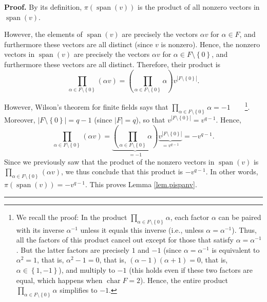 \documentclass[numbers=enddot,12pt,final,onecolumn,notitlepage]{scrartcl}%
\numberwithin{exer}{section}
\theoremstyle{definition}
\newenvironment{proof}[1][Proof]{\noindent\textbf{#1.} }{\ \rule{0.5em}{0.5em}}
\let\prodnonlimits\prod
\renewcommand{\prod}{\prodnonlimits\limits}
\theoremstyle{plainsl}
\begin{document}
\begin{proof}
By its definition, $\pi\left(  \operatorname*{span}\left(  v\right)  \right)
$ is the product of all nonzero vectors in $\operatorname*{span}\left(
v\right)  $.

However, the elements of $\operatorname*{span}\left(  v\right)  $ are
precisely the vectors $\alpha v$ for $\alpha\in F$, and furthermore these
vectors are all distinct (since $v$ is nonzero). Hence, the nonzero vectors in
$\operatorname*{span}\left(  v\right)  $ are precisely the vectors $\alpha v$
for $\alpha\in F\setminus\left\{  0\right\}  $, and furthermore these vectors
are all distinct. Therefore, their product is%
\[
\prod_{\alpha\in F\setminus\left\{  0\right\}  }\left(  \alpha v\right)
=\left(  \prod_{\alpha\in F\setminus\left\{  0\right\}  }\alpha\right)
v^{\left\vert F\setminus\left\{  0\right\}  \right\vert }.
\]


However, Wilson's theorem for finite fields says that $\prod_{\alpha\in
F\setminus\left\{  0\right\}  }\alpha=-1$\ \ \ \ \footnote{We recall the
proof: In the product $\prod_{\alpha\in F\setminus\left\{  0\right\}  }\alpha
$, each factor $\alpha$ can be paired with its inverse $\alpha^{-1}$ unless it
equals this inverse (i.e., unless $\alpha=\alpha^{-1}$). Thus, all the factors
of this product cancel out except for those that satisfy $\alpha=\alpha^{-1}$.
But the latter factors are precisely $1$ and $-1$ (since $\alpha=\alpha^{-1}$
is equivalent to $\alpha^{2}=1$, that is, $\alpha^{2}-1=0$, that is, $\left(
\alpha-1\right)  \left(  \alpha+1\right)  =0$, that is, $\alpha\in\left\{
1,-1\right\}  $), and multiply to $-1$ (this holds even if these two factors
are equal, which happens when $\operatorname*{char}F=2$). Hence, the entire
product $\prod_{\alpha\in F\setminus\left\{  0\right\}  }\alpha$ simplifies to
$-1$.}. Moreover, $\left\vert F\setminus\left\{  0\right\}  \right\vert =q-1$
(since $\left\vert F\right\vert =q$), so that $v^{\left\vert F\setminus
\left\{  0\right\}  \right\vert }=v^{q-1}$. Hence,%
\[
\prod_{\alpha\in F\setminus\left\{  0\right\}  }\left(  \alpha v\right)
=\underbrace{\left(  \prod_{\alpha\in F\setminus\left\{  0\right\}  }%
\alpha\right)  }_{=-1}\underbrace{v^{\left\vert F\setminus\left\{  0\right\}
\right\vert }}_{=v^{q-1}}=-v^{q-1}.
\]
Since we previously saw that the product of the nonzero vectors in
$\operatorname*{span}\left(  v\right)  $ is $\prod_{\alpha\in F\setminus
\left\{  0\right\}  }\left(  \alpha v\right)  $, we thus conclude that this
product is $-v^{q-1}$. In other words, $\pi\left(  \operatorname*{span}\left(
v\right)  \right)  =-v^{q-1}$. This proves Lemma \ref{lem.pispanv}.
\end{proof}
\end{document}
